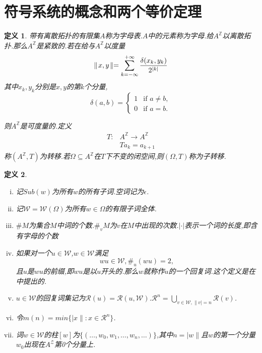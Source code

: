 \documentclass[a4paper,11pt,oneside]{book}
\newtheorem{definition}{\textbf{\hspace{0.7cm}定义}}[section]
\begin{document}
\section{符号系统的概念和两个等价定理}
\begin{definition}
带有离散拓扑的有限集$A$称为字母表.$A$中的元素称为字母.给$A^{\mathbb{Z}}$以离散拓扑.那么$A^{\mathbb{Z}}$是紧致的.若在给与$A^{\mathbb{Z}}$以度量$$\parallel\! x,y\!\parallel =\sum_{k=-\infty}^{+\infty}{\delta (x_k,y_k)\over 2^{|k|}}$$
其中$x_k,y_k$分别是$x,y$的第$k$个分量,
\begin{equation*}
\delta(a,b)=
\begin{cases}
1 &\text{if }a\neq b,\\
0 &\text{if }a=b.
\end{cases}
\end{equation*}

则$A^{\mathbb{Z}}$是可度量的.定义
\begin{align*}
T:& A^{\mathbb{Z}}\rightarrow A^{\mathbb{Z}}\\
  & Ta_k=a_{k+1}
\end{align*}
称$(A^{\mathbb{Z}},T)$为转移.若$\Omega\subseteq A^{\mathbb{Z}}$在$T$下不变的闭空间,则$(\Omega,T)$称为子转移.

\end{definition}


\begin{definition}
\begin{enumerate}[(i)]
\item 记$Sub(w)$为所有$w$的所有子词.空词记为$\epsilon$.
\item 记$\mathcal{W}=\mathcal{W}(\Omega)$为所有$w\in \Omega$的有限子词全体.
\item $\#M$为集合$M$中词的个数.$\#_vM$为$v$在$M$中出现的次数.$|\cdot|$表示一个词的长度,即含有字母的个数
\item 如果对一个$u\in \mathcal{W}$,$w\in \mathcal{W}$满足%
$$w u\in \mathcal{W},\#_u(w u)=2,$$
且$u$是$wu$的前缀,即$wu$是以$u$开头的.那么$w$就称作$u$的一个回复词.这个定义是在\cite{d}中提出的.
\item $u\in \mathcal{W}$的回复词集记为$\mathcal{R}(u)=\mathcal{R}(u,\mathcal{W})$.$\mathcal{R}^n=\bigcup_{v\in \mathcal{W},\|v|=n}\mathcal{R}(v)$.
\item 令$m(n)=min\{|x\|:x\in \mathcal{R}^n\}$.
\item 词$w\in \mathcal{W}$的柱$[w]$为$\{(\ldots,w_0,w_1,\ldots,w_n,\ldots)\}$,其中$n=|w\|$且$w$的第一个分量$w_0$出现在$A^{\mathcal{Z}}$第0个分量上.
\end{enumerate}

\end{definition}
\end{document}
